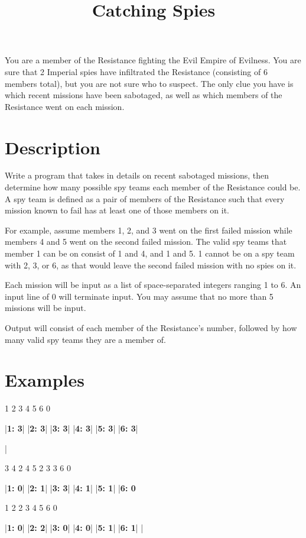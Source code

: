 \documentclass{../codeproblem}
\begin{document}
\title{Catching Spies}

\begin{flavor}
  You are a member of the Resistance fighting the Evil Empire of Evilness. You are sure that 2 Imperial spies have infiltrated the Resistance (consisting of 6 members total), but you are not sure who to suspect. The only clue you have is which recent missions have been sabotaged, as well as which members of the Resistance went on each mission.
\end{flavor}

\section*{Description}
Write a program that takes in details on recent sabotaged missions, then determine how many possible spy teams each member of the Resistance could be. A spy team is defined as a pair of members of the Resistance such that every mission known to fail has at least one of those members on it.

For example, assume members 1, 2, and 3 went on the first failed mission while members 4 and 5 went on the second failed mission. The valid spy teams that member 1 can be on consist of 1 and 4, and 1 and 5. 1 cannot be on a spy team with 2, 3, or 6, as that would leave the second failed mission with no spies on it.

Each mission will be input as a list of space-separated integers ranging 1 to 6. An input line of 0 will terminate input. You may assume that no more than 5 missions will be input.

Output will consist of each member of the Resistance's number, followed by how many valid spy teams they are a member of.

\section*{Examples}
\begin{minipage}[t]{.33\linewidth}
\begin{example}
1 2 3
4 5 6
0

|\textbf{1: 3}|
|\textbf{2: 3}|
|\textbf{3: 3}|
|\textbf{4: 3}|
|\textbf{5: 3}|
|\textbf{6: 3}|

|\end{example}
\end{minipage}
\begin{minipage}[t]{.33\linewidth}
\begin{example}
3 4
2 4 5
2 3
3 6
0

|\textbf{1: 0}|
|\textbf{2: 1}|
|\textbf{3: 3}|
|\textbf{4: 1}|
|\textbf{5: 1}|
|\textbf{6: 0}\end{example}
\end{minipage}
\begin{minipage}[t]{.33\linewidth}
\begin{example}
1 2
2 3 4
5 6
0

|\textbf{1: 0}|
|\textbf{2: 2}|
|\textbf{3: 0}|
|\textbf{4: 0}|
|\textbf{5: 1}|
|\textbf{6: 1}|
|\end{example}
\end{minipage}
\end{document}
